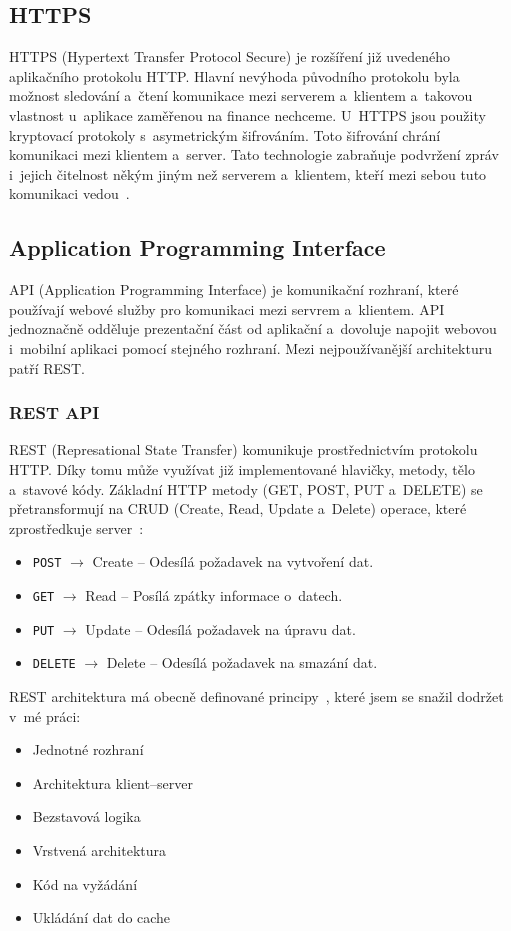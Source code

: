 \subsection{HTTPS}
HTTPS (Hypertext Transfer Protocol Secure) je rozšíření již uvedeného aplikačního protokolu HTTP. Hlavní nevýhoda původního protokolu byla možnost sledování a~čtení komunikace mezi serverem a~klientem a~takovou vlastnost u~aplikace zaměřenou na finance nechceme.
U~HTTPS jsou použity kryptovací protokoly s~asymetrickým šifrováním. Toto šifrování chrání komunikaci mezi klientem a~server. Tato technologie zabraňuje podvržení zpráv i~jejich čitelnost někým jiným než serverem a~klientem, kteří mezi sebou tuto komunikaci vedou~\cite{rfchttps}.

\subsection*{Application Programming Interface}

API (Application Programming Interface) je komunikační rozhraní, které používají webové služby pro komunikaci mezi servrem a~klientem.
API jednoznačně odděluje prezentační část od aplikační a~dovoluje napojit webovou i~mobilní aplikaci pomocí stejného rozhraní.
Mezi nejpoužívanější architekturu patří REST.
\subsubsection{REST API}
REST (Represational State Transfer) komunikuje prostřednictvím protokolu HTTP. Díky tomu může využívat již implementované hlavičky, metody, tělo a~stavové kódy. Základní HTTP metody (GET, POST, PUT a~DELETE) se přetransformují na CRUD (Create, Read, Update a~Delete) operace, které zprostředkuje server~\cite{restapibook}:
\begin{itemize}
\item \texttt{POST} $\rightarrow$ Create -- Odesílá požadavek na vytvoření dat.
\item \texttt{GET} $\rightarrow$ Read -- Posílá zpátky informace o~datech.
\item \texttt{PUT} $\rightarrow$ Update -- Odesílá požadavek na úpravu dat.
\item \texttt{DELETE} $\rightarrow$ Delete --  Odesílá požadavek na smazání dat.
\end{itemize}
REST architektura má obecně definované principy~\cite{restapibook}, které jsem se snažil dodržet v~mé práci:
\begin{itemize}
    \item Jednotné rozhraní
    \item Architektura klient--server
    \item Bezstavová logika
    \item Vrstvená architektura
    \item Kód na vyžádání
    \item Ukládání dat do cache
\end{itemize}

